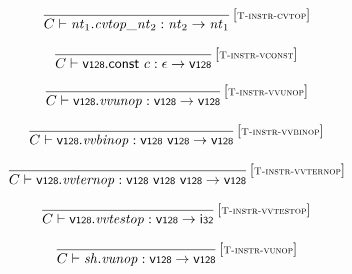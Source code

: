 $$
\begin{array}{@{}c@{}}\displaystyle
\frac{
}{
C \vdash {\mathit{nt}}_1 {.} {{\mathit{cvtop}}}{\mathsf{\_}}{{\mathit{nt}}_2} : {\mathit{nt}}_2 \rightarrow {\mathit{nt}}_1
} \, {[\textsc{\scriptsize T{-}instr{-}cvtop}]}
\qquad
\end{array}
$$

\vspace{1ex}

$$
\begin{array}{@{}c@{}}\displaystyle
\frac{
}{
C \vdash \mathsf{v{\scriptstyle 128}}{.}\mathsf{const}~c : \epsilon \rightarrow \mathsf{v{\scriptstyle 128}}
} \, {[\textsc{\scriptsize T{-}instr{-}vconst}]}
\qquad
\end{array}
$$

$$
\begin{array}{@{}c@{}}\displaystyle
\frac{
}{
C \vdash \mathsf{v{\scriptstyle 128}} {.} {\mathit{vvunop}} : \mathsf{v{\scriptstyle 128}} \rightarrow \mathsf{v{\scriptstyle 128}}
} \, {[\textsc{\scriptsize T{-}instr{-}vvunop}]}
\qquad
\end{array}
$$

$$
\begin{array}{@{}c@{}}\displaystyle
\frac{
}{
C \vdash \mathsf{v{\scriptstyle 128}} {.} {\mathit{vvbinop}} : \mathsf{v{\scriptstyle 128}}~\mathsf{v{\scriptstyle 128}} \rightarrow \mathsf{v{\scriptstyle 128}}
} \, {[\textsc{\scriptsize T{-}instr{-}vvbinop}]}
\qquad
\end{array}
$$

$$
\begin{array}{@{}c@{}}\displaystyle
\frac{
}{
C \vdash \mathsf{v{\scriptstyle 128}} {.} {\mathit{vvternop}} : \mathsf{v{\scriptstyle 128}}~\mathsf{v{\scriptstyle 128}}~\mathsf{v{\scriptstyle 128}} \rightarrow \mathsf{v{\scriptstyle 128}}
} \, {[\textsc{\scriptsize T{-}instr{-}vvternop}]}
\qquad
\end{array}
$$

$$
\begin{array}{@{}c@{}}\displaystyle
\frac{
}{
C \vdash \mathsf{v{\scriptstyle 128}} {.} {\mathit{vvtestop}} : \mathsf{v{\scriptstyle 128}} \rightarrow \mathsf{i{\scriptstyle 32}}
} \, {[\textsc{\scriptsize T{-}instr{-}vvtestop}]}
\qquad
\end{array}
$$

$$
\begin{array}{@{}c@{}}\displaystyle
\frac{
}{
C \vdash {\mathit{sh}} {.} {\mathit{vunop}} : \mathsf{v{\scriptstyle 128}} \rightarrow \mathsf{v{\scriptstyle 128}}
} \, {[\textsc{\scriptsize T{-}instr{-}vunop}]}
\qquad
\end{array}
$$

